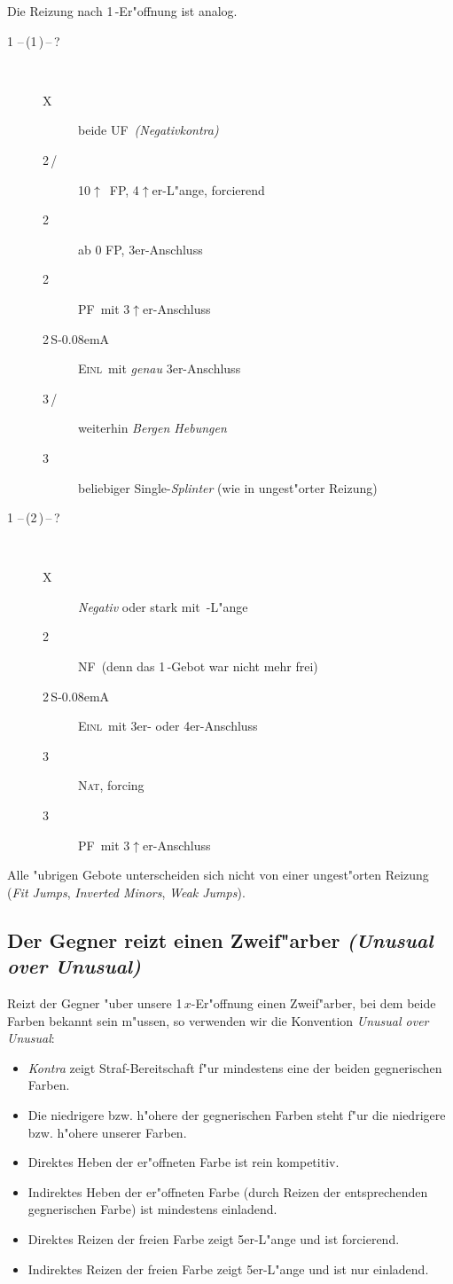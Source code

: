 \documentclass[11pt,german,twocolumn]{scrartcl}
\def\pik{\nobreak\,\Sp}
\def\coe{\nobreak\,\He}
\def\kar{\nobreak\,\Di}
\def\tre{\nobreak\,\Cl}
\def\ka{\Di}
\def\pl{$\uparrow$}
\def\ufa{\nobreak\textsf{UF}}
\def\sa{\nobreak\textsf{S\kern-0.08emA}}
\def\SA{\nobreak\,\sa}
\def\kontra{\textsf{X}}
\def\sep{\nobreak\,--\,}
\newcommand{\conv}[1]{\emph{#1}}
\def\nat{\textsc{Nat}}
\def\pf{\textsc{PF}}
\def\inv{\textsc{Einl}}
\def\nf{\textsc{NF}}
\def\bdsc{\begin{description}}
\def\edsc{\end{description}}
\begin{document}
Die Reizung nach 1\kar-Er"offnung ist analog.

\bdsc
\item[1\coe\sep(1\pik)\sep?]~
\bdsc
\item[\kontra] beide \ufa\ \conv{(Negativkontra)}
\item[2\tre/\ka] 10\pl\ FP, 4\pl{}er-L"ange, forcierend
\item[2\coe] ab 0 FP, 3er-Anschluss
\item[2\pik] \pf\ mit 3\pl{}er-Anschluss
\item[2\SA] \inv\ mit \emph{genau} 3er-Anschluss
\item[3\tre/\ka] weiterhin \conv{Bergen Hebungen}
\item[3\pik] beliebiger Single-\conv{Splinter} (wie in ungest"orter
  Reizung)
\edsc
\item[1\coe\sep(2\kar)\sep?]~
\bdsc
\item[\kontra] \conv{Negativ} oder stark mit \pik-L"ange
\item[2\pik] \nf\ (denn das 1\pik-Gebot war nicht mehr frei)
\item[2\SA] \inv\ mit 3er- oder 4er-Anschluss
\item[3\tre] \nat, forcing
\item[3\kar] \pf\ mit 3\pl{}er-Anschluss
\edsc
\edsc

Alle "ubrigen Gebote unterscheiden sich nicht von einer ungest"orten
Reizung (\conv{Fit Jumps}, \conv{Inverted Minors}, \conv{Weak Jumps}).

\subsection{Der Gegner reizt einen Zweif"arber \conv{(Unusual over
    Unusual)}}

Reizt der Gegner "uber unsere 1\,$x$-Er"offnung einen Zweif"arber, bei
dem beide Farben bekannt sein m"ussen, so verwenden wir die Konvention
\conv{Unusual over Unusual}:
\begin{itemize}
\item \conv{Kontra} zeigt Straf-Bereitschaft f"ur mindestens eine der
  beiden gegnerischen Farben.
\item Die niedrigere bzw. h"ohere der gegnerischen Farben steht
  f"ur die niedrigere bzw. h"ohere unserer Farben.
\item Direktes Heben der er"offneten Farbe ist rein kompetitiv.
\item Indirektes Heben der er"offneten Farbe (durch Reizen der
  entsprechenden gegnerischen Farbe) ist mindestens einladend.
\item Direktes Reizen der freien Farbe zeigt 5er-L"ange und ist
  forcierend.
\item Indirektes Reizen der freien Farbe zeigt 5er-L"ange und ist nur
  einladend.
\end{itemize}
\end{document}
